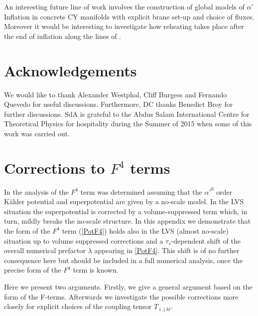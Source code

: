\documentclass[11pt,a4paper]{article}
\begin{document}
An interesting future line of work involves the construction of global models of $\alpha'$ Inflation in concrete CY manifolds with explicit brane set-up and choice of fluxes. Moreover it would be interesting to investigate how reheating takes place after the end of inflation along the lines of \cite{Cicoli:2015bpq, Reheat}.




\section*{Acknowledgements}

We would like to thank Alexander Westphal, Cliff Burgess and Fernando Quevedo for useful discussions. Furthermore, DC thanks Benedict Broy for further discussions. SdA is grateful to the Abdus Salam International Centre for Theoretical Physics for hospitality during the Summer of 2015 when some of this work was carried out.

\appendix
\section{Corrections to $F^4$ terms}
\label{AppB}

In the analysis of \cite{Ciupke:2015msa} the $F^4$ term was determined assuming that the $\alpha'^0$ order K\"ahler potential and superpotential are given by a no-scale model. In the LVS situation the superpotential is corrected by a volume-suppressed term which, in turn, mildly breaks the no-scale structure. In this appendix we demonstrate that the form of the $F^4$ term (\ref{PotF4}) holds also in the LVS (almost no-scale) situation up to volume suppressed corrections and a $\tau_s$-dependent shift of the overall numerical prefactor $\lambda$ appearing in \eqref{PotF4}. This shift is of no further consequence here but should be included in a full numerical analysis, once the precise form of the $F^4$ term is known.

Here we present two arguments. Firstly, we give a general argument based on the form of the F-terms. Afterwards we investigate the possible corrections more closely for explicit choices of the coupling tensor $T_{\bar{\imath} \bar{\jmath}kl}$.
\end{document}

